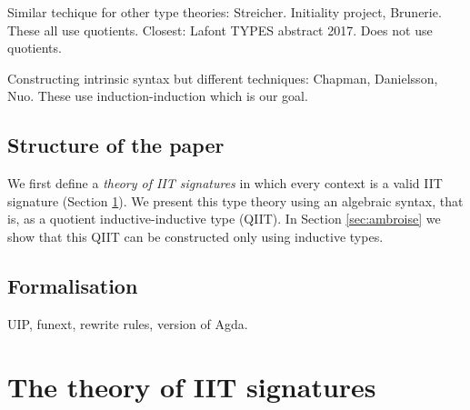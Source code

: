 \documentclass[a4paper,UKenglish,cleveref, autoref]{lipics-v2019}
\begin{document}
Similar techique for other type theories: Streicher. Initiality
project, Brunerie. These all use quotients. Closest: Lafont TYPES
abstract 2017. Does not use quotients.

Constructing intrinsic syntax but different techniques: Chapman,
Danielsson, Nuo. These use induction-induction which is our goal.

\subsection{Structure of the paper}

We first define a \emph{theory of IIT signatures} in which every
context is a valid IIT signature (Section
\ref{sec:theory_of_signatures}). We present this type theory using an
algebraic \cite{ttintt} syntax, that is, as a quotient
inductive-inductive type (QIIT). In Section \ref{sec:ambroise} we show
that this QIIT can be constructed only using inductive types.

\subsection{Formalisation}

UIP, funext, rewrite rules, version of Agda.

\section{The theory of IIT signatures}
\label{sec:theory_of_signatures}
\end{document}

